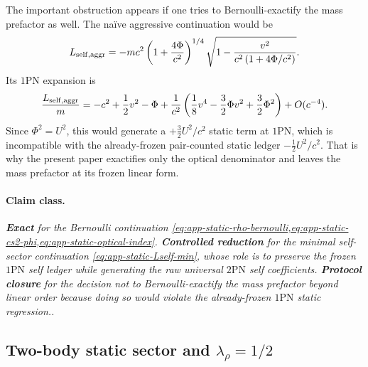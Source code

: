 \documentclass[11pt]{article}
\newcommand{\OnePN}{\mathrm{1PN}}
\newcommand{\TwoPN}{\mathrm{2PN}}
\newcommand{\Exact}{\textbf{Exact}}
\newcommand{\Controlled}{\textbf{Controlled reduction}}
\newcommand{\Protocol}{\textbf{Protocol closure}}
\newcommand{\claimclass}[1]{\paragraph{Claim class.}\emph{#1.}}
\begin{document}
The important obstruction appears if one tries to Bernoulli-exactify the mass prefactor
as well.  The naïve aggressive continuation would be
\begin{equation}
L_{\rm self,aggr}
=-mc^2\left(1+\frac{4\Phi}{c^2}\right)^{1/4}
\sqrt{1-\frac{v^2}{c^2\left(1+4\Phi/c^2\right)}}.
\label{eq:app-static-Lself-aggr}
\end{equation}
Its \(\OnePN\) expansion is
\begin{equation}
\frac{L_{\rm self,aggr}}{m}
=-c^2+\frac12v^2-\Phi
+\frac{1}{c^2}\left(\frac18v^4-\frac32\Phi v^2+\frac32\Phi^2\right)
+O(c^{-4}).
\label{eq:app-static-Lself-aggr-1pn}
\end{equation}
Since \(\Phi^2=U^2\), this would generate a
\(+\frac32U^2/c^2\) static term at \(\OnePN\), which is incompatible with the already-frozen
pair-counted static ledger
\(-\frac12U^2/c^2\).
That is why the present paper exactifies only the optical denominator and leaves the mass
prefactor at its frozen linear form.

\claimclass{\Exact{} for the Bernoulli continuation
\cref{eq:app-static-rho-bernoulli,eq:app-static-cs2-phi,eq:app-static-optical-index}.
\Controlled{} for the minimal self-sector continuation
\cref{eq:app-static-Lself-min}, whose role is to preserve the frozen \(\OnePN\) self
ledger while generating the raw universal \(\TwoPN\) self coefficients.
\Protocol{} for the decision not to Bernoulli-exactify the mass prefactor beyond linear
order because doing so would violate the already-frozen \(\OnePN\) static regression.}

\subsection{Two-body static sector and \texorpdfstring{$\lambda_\rho=1/2$}{lambda\_rho=1/2}}
\label{app:static-two-body}
\end{document}
